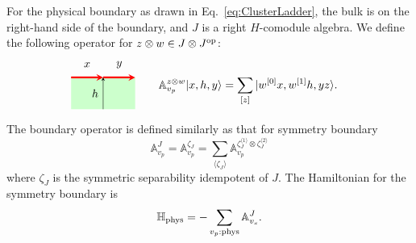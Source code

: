 \documentclass[a4paper,11pt]{article}
\theoremstyle{theorem}
\theoremstyle{remark}
\newcommand{\Av}{\mathbb{A}}
\newcommand{\Hbb}{\mathbb{H}}
\begin{document}
For the physical boundary as drawn in Eq.~\eqref{eq:ClusterLadder}, the bulk is on the right-hand side of the boundary, and \( J \) is a right \( H \)-comodule algebra. We define the following operator for \( z \otimes w \in J \otimes J^{\rm op} \):
\begin{align}
       \begin{aligned}
\begin{tikzpicture}
    \begin{scope}[rotate=-90] %
        \fill[green!20] (0, 0) rectangle (1,2); %
        \draw[-stealth,red,line width = 1.6pt] (0,0) -- (0,1);
        \draw[-stealth,red, line width = 1.6pt] (0,1) -- (0,2); 
        \draw[-stealth,black] (1,1) -- (0,1); 
        \node[ line width=0.2pt, dashed, draw opacity=0.5] (a) at (-0.4,0.5){$x$};
        \node[ line width=0.2pt, dashed, draw opacity=0.5] (a) at (-0.4,1.5){$y$};
        \node[ line width=0.2pt, dashed, draw opacity=0.5] (a) at (0.5,0.75){$h$};
    \end{scope}
\end{tikzpicture}
\end{aligned} & \quad \quad \Av^{z\otimes w}_{v_p}|x,h,y\rangle=\sum_{[z]} | w^{[0]}x, w^{[1]}h, y z\rangle.  \label{eq:bdd-sta-A2}
\end{align}
The boundary operator is defined similarly as that for symmetry boundary 
\begin{equation}
    \Av^J_{v_p} = \Av^{\zeta_J}_{v_p} = \sum_{\langle \zeta_J \rangle} \Av^{\zeta_J^{\langle 1 \rangle} \otimes \zeta_J^{\langle 2 \rangle}}_{v_p}
\end{equation}
where \(\zeta_J\) is the symmetric separability idempotent of \( J \). 
The Hamiltonian for the symmetry boundary is
\begin{equation}
    \Hbb_{\rm phys} = -\sum_{v_p:\rm phys} \Av_{v_s}^J.
\end{equation}
\end{document}
